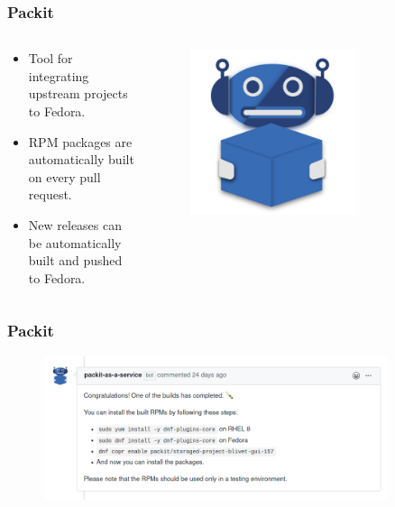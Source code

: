 \documentclass[aspectratio=169]{beamer}
\begin{document}
\begin{frame}
	\frametitle{Packit}
	
	\begin{columns}
\begin{column}{0.6\textwidth}
	\begin{block}{}
		\begin{itemize}
			\item Tool for integrating upstream projects to Fedora.
			\item RPM packages are automatically built on every pull request.
			\item New releases can be automatically built and pushed to Fedora.
		\end{itemize}
	\end{block}
\end{column}
\begin{column}{0.4\textwidth}
	\begin{figure}[ht!]
	\begin{center}
  	  \includegraphics[width=0.7\textwidth]{img/packit-logo.png}
	\end{center}
	\end{figure}
\end{column}
\end{columns}
\end{frame}

\begin{frame}
	\frametitle{Packit}
	\begin{figure}[ht!]
	\begin{center}
  	  \includegraphics[width=0.9\textwidth]{img/packit-1.png}
	\end{center}
	\end{figure}
\end{frame}
\end{document}
